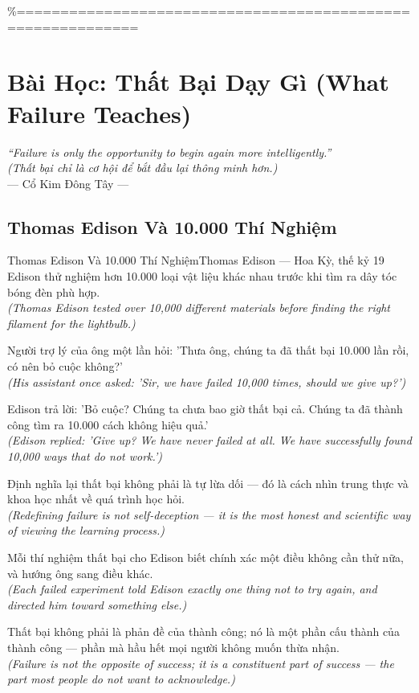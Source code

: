 \%============================================================
\chapter{Bài Học: Thất Bại Dạy Gì (What Failure Teaches)}
\begin{center}
  \textit{\color{truyengold}``Failure is only the opportunity to begin again more intelligently.''}\\[4pt]
  \textit{(Thất bại chỉ là cơ hội để bắt đầu lại thông minh hơn.)}\\[4pt]
  \small\color{truyenblue}--- Cổ Kim Đông Tây ---
\end{center}
\ngancach

\section{Thomas Edison Và 10.000 Thí Nghiệm}
\begin{truyen}{Thomas Edison Và 10.000 Thí Nghiệm}{Thomas Edison --- Hoa Kỳ, thế kỷ 19}
 Edison thử nghiệm hơn 10.000 loại vật liệu khác nhau trước khi tìm ra dây tóc bóng đèn phù hợp.\\[4pt]
\textit{(Thomas Edison tested over 10,000 different materials before finding the right filament for the lightbulb.)}

Người trợ lý của ông một lần hỏi: 'Thưa ông, chúng ta đã thất bại 10.000 lần rồi, có nên bỏ cuộc không?'\\[4pt]
\textit{(His assistant once asked: 'Sir, we have failed 10,000 times, should we give up?')}

Edison trả lời: 'Bỏ cuộc? Chúng ta chưa bao giờ thất bại cả. Chúng ta đã thành công tìm ra 10.000 cách không hiệu quả.'\\[4pt]
\textit{(Edison replied: 'Give up? We have never failed at all. We have successfully found 10,000 ways that do not work.')}

Định nghĩa lại thất bại không phải là tự lừa dối --- đó là cách nhìn trung thực và khoa học nhất về quá trình học hỏi.\\[4pt]
\textit{(Redefining failure is not self-deception --- it is the most honest and scientific way of viewing the learning process.)}

Mỗi thí nghiệm thất bại cho Edison biết chính xác một điều không cần thử nữa, và hướng ông sang điều khác.\\[4pt]
\textit{(Each failed experiment told Edison exactly one thing not to try again, and directed him toward something else.)}

\end{truyen}
\begin{baihoc}
  Thất bại không phải là phản đề của thành công; nó là một phần cấu thành của thành công --- phần mà hầu hết mọi người không muốn thừa nhận.\\[4pt]
  \textit{(Failure is not the opposite of success; it is a constituent part of success --- the part most people do not want to acknowledge.)}
\end{baihoc}

